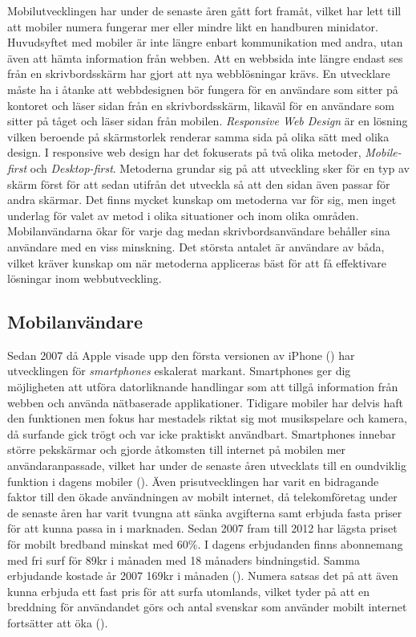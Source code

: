 \documentclass[11pt]{article}
\begin{document}
Mobilutvecklingen har under de senaste åren gått fort framåt, vilket har lett till att mobiler numera fungerar mer eller mindre likt en handburen minidator. Huvudsyftet med mobiler är inte längre enbart kommunikation med andra, utan även att hämta information från webben. Att en webbsida inte längre endast ses från en skrivbordsskärm har gjort att nya webblösningar krävs. En utvecklare måste ha i åtanke att webbdesignen bör fungera för en användare som sitter på kontoret och läser sidan från en skrivbordsskärm, likaväl för en användare som sitter på tåget och läser sidan från mobilen. \textit{Responsive Web Design} är en lösning vilken beroende på skärmstorlek renderar samma sida på olika sätt med olika design. I responsive web design har det fokuserats på två olika metoder, \textit{Mobile-first} och \textit{Desktop-first}. Metoderna grundar sig på att utveckling sker för en typ av skärm först för att sedan utifrån det utveckla så att den sidan även passar för andra skärmar. Det finns mycket kunskap om metoderna var för sig, men inget underlag för valet av metod i olika situationer och inom olika områden. Mobilanvändarna ökar för varje dag medan skrivbordsanvändare behåller sina användare med en viss minskning. Det största antalet är användare av båda, vilket kräver kunskap om när metoderna appliceras bäst för att få effektivare lösningar inom webbutveckling.

\subsection{Mobilanvändare}

Sedan 2007 då Apple visade upp den första versionen av iPhone (\cite{AppleRevolution}) har utvecklingen för \textit{smartphones} eskalerat markant. Smartphones ger dig möjligheten att utföra datorliknande handlingar som att tillgå information från webben och använda nätbaserade applikationer. Tidigare mobiler har delvis haft den funktionen men fokus har mestadels riktat sig mot musikspelare och kamera, då surfande gick trögt och var icke praktiskt användbart.
Smartphones innebar större pekskärmar och gjorde åtkomsten till internet på mobilen mer användaranpassade, vilket har under de senaste åren utvecklats till en oundviklig funktion i dagens mobiler (\cite[s. 4]{Cfigroup_2009}).  Även prisutvecklingen har varit en bidragande faktor till den ökade användningen av mobilt internet, då telekomföretag under de senaste åren har varit tvungna att sänka avgifterna samt erbjuda fasta priser för att kunna passa in i marknaden. Sedan 2007 fram till 2012 har lägsta priset för mobilt bredband minskat med 60\%. I dagens erbjudanden finns abonnemang med fri surf för 89kr i månaden med 18 månaders bindningstid. Samma erbjudande kostade år 2007 169kr i månaden (\cite[s. 36]{pts}). Numera satsas det på att även kunna erbjuda ett fast pris för att surfa utomlands, vilket tyder på att en breddning för användandet görs och antal svenskar som använder mobilt internet fortsätter att öka (\cite{telekomidag}).
\end{document}
